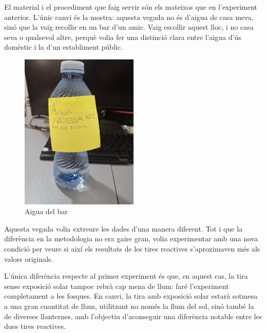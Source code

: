 El material i el procediment que faig servir són els mateixos que en l’experiment anterior. L’únic canvi és la mostra: aquesta vegada no és d’aigua de casa meva, sinó que la vaig recollir en un bar d’un amic. Vaig escollir aquest lloc, i no casa seva o qualsevol altre, perquè volia fer una distinció clara entre l’aigua d’ús domèstic i la d’un establiment públic.
\begin{figure}[H]
\centering
\includegraphics[width=0.5\textwidth, angle=270]{./Figures/AguaBar.png}
\caption{Aigua del bar}
\label{fig:AguaDelBar}
\end{figure}
Aquesta vegada volia extreure les dades d’una manera diferent. Tot i que la diferència en la metodologia no era gaire gran, volia experimentar amb una nova condició per veure si així els resultats de les tires reactives s’aproximaven més als valors originals.

L’única diferència respecte al primer experiment és que, en aquest cas, la tira sense exposició solar tampoc rebrà cap mena de llum: faré l’experiment completament a les fosques. En canvi, la tira amb exposició solar estarà sotmesa a una gran cuantitat de llum, utilitzant no només la llum del sol, sinó també la de diverses llanternes, amb l’objectiu d’aconseguir una diferència notable entre les dues tires reactives.

